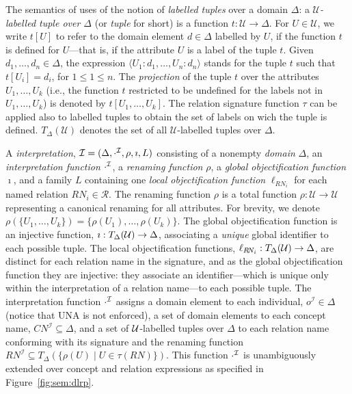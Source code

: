 \documentclass[envcountsame,draft]{llncs}
\newcommand{\nb}[1]{\textcolor{red}{\textdagger}\marginpar{\scriptsize\raggedright\textcolor{red}{#1}}}
\renewcommand\dom{\ensuremath{\Delta}\xspace}
\begin{document}
The semantics of \DLRp uses of the notion of \emph{labelled tuples} over a domain $\Delta$: a 
\emph{$\mathcal{U}$-labelled tuple over $\Delta$} (or \emph{tuple} for short) is a function 
$t \colon \mathcal{U} \to \Delta$. For $U\in \mathcal{U}$, we write $t[U]$ to refer to the domain element ${d\in \Delta}$ 
labelled by $U$, if the function $t$ is defined for $U$---that is, if the attribute $U$ is a label of the tuple $t$. 
Given $d_1,\dots,d_n\in \Delta$, the expression ${\langle U_1\colon d_1,\ldots,U_n\colon d_n\rangle}$ stands for the 
tuple $t$ such that ${t[U_i]=d_i}$, for ${1\leq 1\leq n}$. 
The \emph{projection} of the tuple $t$ over the attributes ${U_1,\ldots,U_k}$ (i.e., the function $t$ 
restricted to be undefined for the labels not in ${U_1,\ldots,U_k}$)
is denoted by ${t[U_1,\ldots,U_k]}$. 
The\nb{A: added} relation signature function $\tau$ can be applied also to labelled
tuples to obtain the set of labels on wich the tuple is defined.
$T_\Delta(\mathcal{U})$ denotes the set of all $\mathcal{U}$-labelled tuples over $\Delta$.

A \DLRp \emph{interpretation}, $\Imc = (\dom, \cdot^\Imc, \rho, \imath, L)$ consisting of a nonempty 
\emph{domain} $\dom$, an \emph{interpretation function} $\cdot^\mathcal{I}$, a \emph{renaming function} $\rho$, a \emph{global objectification function} $\imath$, and a family $L$ containing one \emph{local objectification function} 
$\ell_{R\!N_i}$ for each named relation $R\!N_i\in\mathcal{R}$.
%
The renaming function $\rho$ is a total function ${\rho:\mathcal{U}\to\mathcal{U}}$ representing a canonical renaming 
for all attributes. For brevity, we denote $\rho(\{U_1,\ldots,U_k\}) = \{\rho(U_1),\ldots,\rho(U_k)\}$.
%
The global objectification function is an injective function, ${\imath:T_{\dom}(\Umc) \to \dom}$, associating a 
\emph{unique} global identifier to each possible tuple.
%
The local objectification functions, ${\ell_{R\!N_i}:T_{\dom}(\Umc) \to \dom}$, are distinct for each relation name in the 
signature, and as the global objectification function they are injective: they associate an identifier---which is unique only 
within the interpretation of a relation name---to each possible tuple.
The interpretation function $\cdot^\mathcal{I}$ assigns a domain element to
each individual, $o^{\mathcal{I}}\in\dom$ (notice\nb{A: added} that UNA is not enforced), a set of 
domain elements to each concept name, $C\!N^{\mathcal{I}}\subseteq \dom$, and a set of $\mathcal{U}$-labelled tuples 
over $\dom$ to each relation name conforming with its signature and the renaming function
$R\!N^{\mathcal{I}}\subseteq T_{\dom}(\{\rho(U)\mid U\in\tau(R\!N)\}).$ 
%
This function $\cdot^\mathcal{I}$ is unambiguously extended over concept and relation expressions as specified in 
Figure~\ref{fig:sem:dlrp}.
\end{document}
